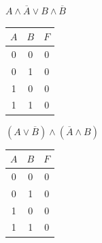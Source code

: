     \begin{minipage}[t]{0.3\textwidth}
        \centering
        \begin{enumerate}
            \setcounter{enumi}{3}
            \begin{spacing}{1.2}
                \item $A \wedge \overline A \vee B \wedge \overline B$\\
            \end{spacing}
            \begin{tabular}{|c|c|c|}
                \hline
                $A$ & $B$ & $F$ \\
                \hline
                0   & 0   & 0   \\
                \hline
                0   & 1   & 0   \\
                \hline
                1   & 0   & 0   \\
                \hline
                1   & 1   & 0   \\
                \hline
            \end{tabular}
        \end{enumerate}
    \end{minipage}
    \begin{minipage}[t]{0.3\textwidth}
        \centering
        \begin{enumerate}
            \setcounter{enumi}{4}
            \begin{spacing}{1.2}
                \item $(A \vee \overline B) \wedge (\overline A \wedge B)$\\
            \end{spacing}
            \begin{tabular}{|c|c|c|}
                \hline
                $A$ & $B$ & $F$ \\
                \hline
                0   & 0   & 0   \\
                \hline
                0   & 1   & 0   \\
                \hline
                1   & 0   & 0   \\
                \hline
                1   & 1   & 0   \\
                \hline
            \end{tabular}
        \end{enumerate}
    \end{minipage}
